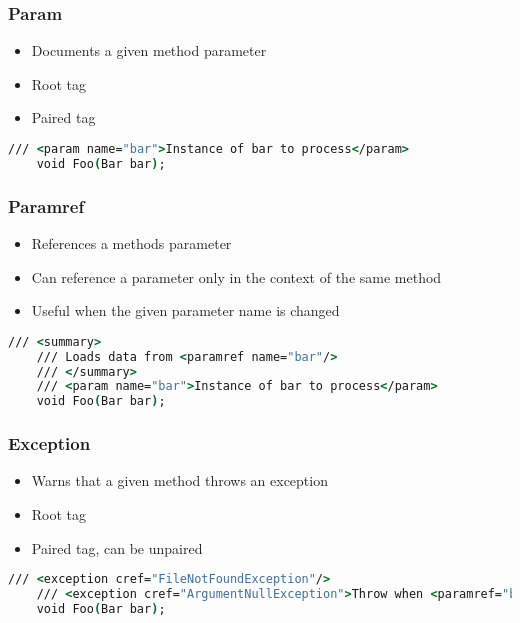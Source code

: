 \subsubsection*{Param}
\begin{itemize}
    \item Documents a given method parameter
    \item Root tag
    \item Paired tag
\end{itemize}

\begin{lstlisting}[language=csh]
    /// <param name="bar">Instance of bar to process</param>
    void Foo(Bar bar);
\end{lstlisting}

\subsubsection*{Paramref}
\begin{itemize}
    \item References a methods parameter
    \item Can reference a parameter only in the context of the same method
    \item Useful when the given parameter name is changed
\end{itemize}

\begin{lstlisting}[language=csh]
    /// <summary>
    /// Loads data from <paramref name="bar"/>
    /// </summary>
    /// <param name="bar">Instance of bar to process</param>
    void Foo(Bar bar);
\end{lstlisting}

\subsubsection*{Exception}
\begin{itemize}
    \item Warns that a given method throws an exception
    \item Root tag
    \item Paired tag, can be unpaired
\end{itemize}

\begin{lstlisting}[language=csh]
    /// <exception cref="FileNotFoundException"/>
    /// <exception cref="ArgumentNullException">Throw when <paramref="bar"/> is found to be <c>null</c></exception>
    void Foo(Bar bar);
\end{lstlisting}

